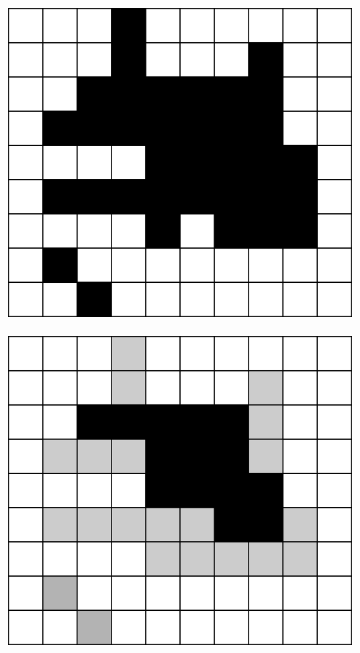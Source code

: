 \documentclass[
  digital,     %
  oneside,     %
  nosansbold,  %
  nocolorbold, %
  lof,         %
  lot,         %
]{fithesis4}
\begin{document}
\begin{figure}
    \begin{subfigure}[t]{0.4\textwidth}
        \centering
        \includegraphics[width=\textwidth]{resources/inkscape/opening_orig.png}
        \caption{}
        \label{fig:opening_orig}
    \end{subfigure}
    \begin{subfigure}[t]{0.4\textwidth}
        \centering
        \includegraphics[width=\textwidth]{resources/inkscape/opening_erosion.png}

\end{subfigure}
\end{figure}
\end{document}
